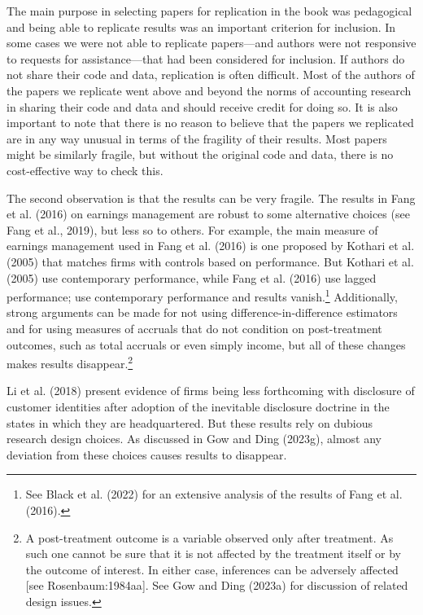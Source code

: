 \documentclass[
  letterpaper,
  DIV=11,
  numbers=noendperiod]{scrartcl}
\begin{document}
The main purpose in selecting papers for replication in the book was
pedagogical and being able to replicate results was an important
criterion for inclusion. In some cases we were not able to replicate
papers---and authors were not responsive to requests for
assistance---that had been considered for inclusion. If authors do not
share their code and data, replication is often difficult. Most of the
authors of the papers we replicate went above and beyond the norms of
accounting research in sharing their code and data and should receive
credit for doing so. It is also important to note that there is no
reason to believe that the papers we replicated are in any way unusual
in terms of the fragility of their results. Most papers might be
similarly fragile, but without the original code and data, there is no
cost-effective way to check this.

The second observation is that the results can be very fragile. The
results in Fang et al. (2016) on earnings management are robust to some
alternative choices (see Fang et al., 2019), but less so to others. For
example, the main measure of earnings management used in Fang et al.
(2016) is one proposed by Kothari et al. (2005) that matches firms with
controls based on performance. But Kothari et al. (2005) use
contemporary performance, while Fang et al. (2016) use lagged
performance; use contemporary performance and results vanish.\footnote{See
  Black et al. (2022) for an extensive analysis of the results of Fang
  et al. (2016).} Additionally, strong arguments can be made for not
using difference-in-difference estimators and for using measures of
accruals that do not condition on post-treatment outcomes, such as total
accruals or even simply income, but all of these changes makes results
disappear.\footnote{A post-treatment outcome is a variable observed only
  after treatment. As such one cannot be sure that it is not affected by
  the treatment itself or by the outcome of interest. In either case,
  inferences can be adversely affected {[}see Rosenbaum:1984aa{]}. See
  Gow and Ding (2023a) for discussion of related design issues.}

Li et al. (2018) present evidence of firms being less forthcoming with
disclosure of customer identities after adoption of the inevitable
disclosure doctrine in the states in which they are headquartered. But
these results rely on dubious research design choices. As discussed in
Gow and Ding (2023g), almost any deviation from these choices causes
results to disappear.
\end{document}
